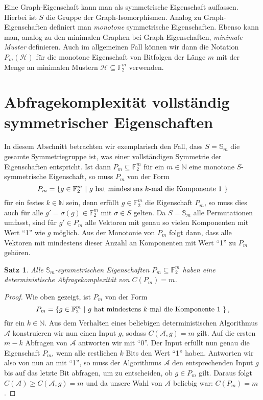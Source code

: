 \documentclass[10pt,a4paper, footheight=1mm, bibliography=totoc]{scrreprt}
\newtheorem{Satz}[definition]{Satz}
\theoremstyle{definition}
\begin{document}
Eine Graph-Eigenschaft kann man als symmetrische
Eigenschaft auffassen. Hierbei ist $S$ die Gruppe
der Graph-Isomorphismen.
Analog zu Graph-Eigenschaften definiert man
\emph{monotone} symmetrische Eigenschaften. 
Ebenso kann man, analog zu den minimalen Graphen bei
Graph-Eigenschaften, \emph{minimale Muster} definieren.
Auch im allgemeinen Fall können wir dann die Notation
$P_m(\mathcal{H})$ für die monotone Eigenschaft
von Bitfolgen der Länge $m$ mit der Menge an minimalen
Mustern $\mathcal{H}\subseteq \mathbb{F}_2^m$ verwenden.

\section{Abfragekomplexität vollständig symmetrischer Eigenschaften}
In diesem Abschnitt betrachten wir exemplarisch
den Fall, dass $S=\mathbb{S}_m$ die gesamte Symmetriegruppe
ist, was einer vollständigen Symmetrie der Eigenschaften entspricht.
Ist dann $P_m\subseteq \mathbb{F}_2^m$ für ein $m\in\mathbb{N}$ eine monotone 
$S$-symmetrische Eigenschaft, so muss 
$P_m$ von der Form 
$$ P_m= \{ g\in \mathbb{F}_2^m \ |
\ g \textup{ hat mindestens } k\textup{-mal die Komponente } 1 \ \}$$
für ein festes $k\in \mathbb{N}$ sein, denn erfüllt $g\in \mathbb{F}_2^m$ die Eigenschaft
$P_m$, so muss dies auch für alle $g'=\sigma(g)\in\mathbb{F}_2^m$
mit $\sigma\in S$ gelten. Da $S=\mathbb{S}_m$ alle Permutationen
umfasst, sind für $g'\in P_m$ alle Vektoren mit
genau so vielen Komponenten mit Wert "`1"' wie $g$ möglich. Aus der
Monotonie von $P_m$ folgt dann, dass alle Vektoren mit
mindestens dieser Anzahl an Komponenten mit Wert "`1"' zu
$P_m$ gehören.
\begin{Satz}
\label{thm:SymmetrischeGruppe}
Alle $\mathbb{S}_m$-symmetrischen Eigenschaften 
$P_m \subseteq \mathbb{F}_2^m$ haben eine
deterministische Abfragekomplexität
von $C(P_m) = m$.
\end{Satz}
\begin{proof}
Wie oben gezeigt, ist $P_m$ von der Form
$$ P_m= \{ g\in \mathbb{F}_2^m \ |
\ g \textup{ hat mindestens } k\textup{-mal die Komponente } 1 \ \}\,,$$
für ein $k\in \mathbb{N}$.
Aus dem Verhalten eines beliebigen deterministischen Algorithmus
$\mathcal{A}$ konstruieren wir nun einen Input $g$,
sodass $C(\mathcal{A},g)=m$ gilt. Auf die ersten $m-k$
Abfragen von $\mathcal{A}$ antworten wir mit "`0"'.
Der Input erfüllt nun genau die Eigenschaft $P_m$, wenn
alle restlichen $k$ Bits den Wert "`1"' haben.
Antworten wir also von nun an mit "`1"', so muss der 
Algorithmus $\mathcal{A}$
den entsprechenden Input $g$ bis auf das letzte Bit abfragen,
um zu entscheiden, ob $g\in P_m$ gilt. Daraus folgt
$C(\mathcal{A}) \geq C(\mathcal{A}, g) = m$ und da unsere
Wahl von $\mathcal{A}$ beliebig war: $C(P_m)=m$.
\end{proof}
\end{document}

